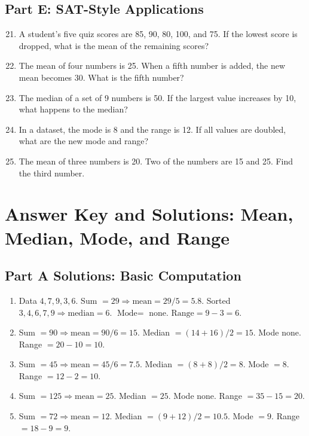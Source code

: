 \documentclass[14pt]{extarticle}
\begin{document}
\subsection*{Part E: SAT-Style Applications}
\begin{enumerate}
  \setcounter{enumi}{20}
  \item A student’s five quiz scores are 85, 90, 80, 100, and 75. If the lowest score is dropped, what is the mean of the remaining scores?
  \item The mean of four numbers is 25. When a fifth number is added, the new mean becomes 30. What is the fifth number?
  \item The median of a set of 9 numbers is 50. If the largest value increases by 10, what happens to the median?
  \item In a dataset, the mode is 8 and the range is 12. If all values are doubled, what are the new mode and range?
  \item The mean of three numbers is 20. Two of the numbers are 15 and 25. Find the third number.
\end{enumerate}

\newpage


\section*{Answer Key and Solutions: Mean, Median, Mode, and Range}

\subsection*{Part A Solutions: Basic Computation}
\begin{enumerate}
  \item Data \(4,7,9,3,6\). Sum \(=29\Rightarrow \text{mean}=29/5=5.8\). Sorted \(3,4,6,7,9\Rightarrow \text{median}=6\). \(\text{Mode}=\) none. \(\text{Range}=9-3=6\).
  \item Sum \(=90\Rightarrow \text{mean}=90/6=15\). Median \(=(14+16)/2=15\). Mode none. Range \(=20-10=10\).
  \item Sum \(=45\Rightarrow \text{mean}=45/6=7.5\). Median \(=(8+8)/2=8\). Mode \(=8\). Range \(=12-2=10\).
  \item Sum \(=125\Rightarrow \text{mean}=25\). Median \(=25\). Mode none. Range \(=35-15=20\).
  \item Sum \(=72\Rightarrow \text{mean}=12\). Median \(=(9+12)/2=10.5\). Mode \(=9\). Range \(=18-9=9\).
\end{enumerate}
\end{document}

